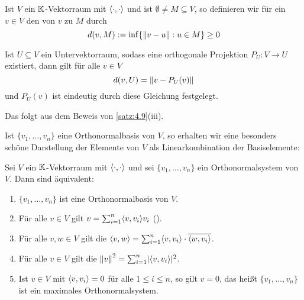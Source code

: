 \begin{definition}[Abstand]
	\label{def:4.10}
	Ist $V$ ein $\mathbb{K}$-Vektorraum mit $\left\langle\cdot,\cdot\right\rangle$ und ist $\emptyset \neq M \subseteq V$, so definieren wir für ein $v \in V$ den  von $v$ zu $M$ durch
	\[
		d(v,M) := \inf \{ \left\lVert v-u\right\rVert : u \in M\} \geq 0
	\]
\end{definition}
\newpage
\begin{korollar}
	\label{kor:4.11}
	Ist $U \subseteq V$ ein Untervektorraum, sodass eine orthogonale Projektion $P_U\colon V \rightarrow U$ existiert, dann gilt für alle $v \in V$
	\[
		d(v,U) = \left\lVert v - P_U(v)\right\rVert
	\]
	und $P_U(v)$ ist eindeutig durch diese Gleichung festgelegt.
\end{korollar}

\begin{beweis}
	Das folgt aus dem Beweis von \autoref{satz:4.9}(iii). \qedhere
\end{beweis}

Ist $\{v_1,\dots,v_n\}$ eine Orthonormalbasis von $V$, so erhalten wir eine besonders schöne Darstellung der Elemente von $V$ als Linearkombination der Basiselemente:

\begin{satz}[Fourierentwicklung]
	\label{satz:4.12}
	Sei $V$ ein $\mathbb{K}$-Vektorraum mit $\left\langle\cdot,\cdot\right\rangle$ und sei $\{v_1,\dots,v_n\}$ ein Orthonormalsystem von $V$.
	Dann sind äquivalent:
	\begin{enumerate}[(1)]
		\item $\{v_1,\dots,v_n\}$ ist eine Orthonormalbasis von $V$.
		\item Für alle $v \in V$ gilt $v = \sum_{i=1}^{n} \sk{v,v_i} v_i$ ().
		\item Für alle $v,w \in V$ gilt die  $\sk{v,w} = \sum_{i=1}^{n} \sk{v,v_i} \cdot \ol{\sk{w,v_i}}$.
		\item Für alle $v \in V$ gilt die  $\left\lVert v\right\rVert^2 = \sum_{i=1}^{n} \lvert\left\langle v,v_i\right\rangle\rvert^2$.
		\item Ist $v \in V$ mit $\left\langle v,v_i\right\rangle = 0$ für alle $1 \leq i \leq n$, so gilt $v = 0$, das heißt $\{v_1,\dots,v_n\}$ ist ein maximales Orthonormalsystem.
	\end{enumerate}
\end{satz}

